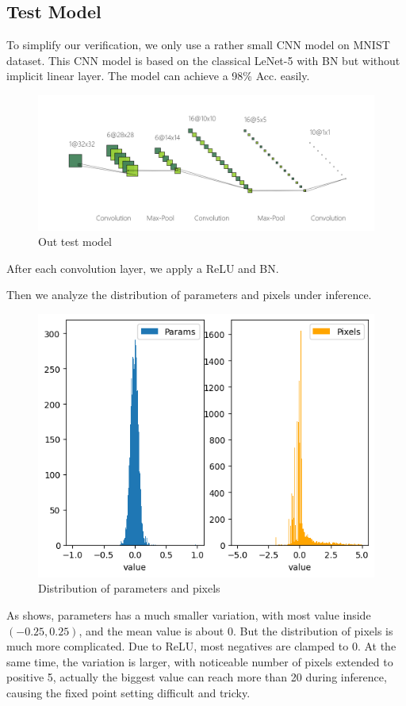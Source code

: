 \subsection{Test Model}

To simplify our verification, we only use a rather small CNN model on MNIST dataset. This CNN model is based on the classical LeNet-5 with BN but without implicit linear layer. The model can achieve a 98\% Acc. easily.

\begin{figure}[!htb]
    \centering
    \includegraphics[width=\columnwidth]{../figures/net.png}
    \caption{Out test model}
    \label{fig:net}
\end{figure}

After each convolution layer, we apply a ReLU and BN.

Then we analyze the distribution of parameters and pixels under inference.

\begin{figure}[!htb]
    \centering
    \includegraphics[width=0.9\columnwidth]{../figures/distribution.png}
    \caption{Distribution of parameters and pixels}
    \label{fig:distribution}
\end{figure}

As  shows, parameters has a much smaller variation, with most value inside $(-0.25, 0.25)$, and the mean value is about 0. But the distribution of pixels is much more complicated. Due to ReLU, most negatives are clamped to 0. At the same time, the variation is larger, with noticeable number of pixels extended to positive 5, actually the biggest value can reach more than 20 during inference, causing the fixed point setting difficult and tricky.